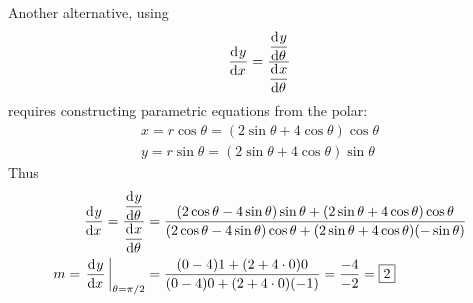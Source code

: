 \documentclass[12pt,answers]{exam}
\begin{document}
\begin{questions}
\begin{solution}
    Another alternative, using
    \[
        \dod{y}{x} = \frac{\dod{y}{\theta}}{\dod{x}{\theta}}
    \]
    requires constructing parametric equations from the polar:
    \begin{align*}
        x = r \cos \theta = (2\sin \theta + 4\cos \theta) \cos\theta \\ 
        y = r \sin \theta = (2\sin \theta + 4\cos \theta) \sin\theta
    \end{align*}
    Thus
    \begin{align*}
        \dod{y}{x} = \frac{\dod{y}{\theta}}{\dod{x}{\theta}}
        &= \frac{(2\cos\theta-4\sin\theta)\sin\theta + (2\sin\theta+4\cos\theta)\cos\theta}{(2\cos\theta - 4\sin\theta) \cos\theta + (2\sin\theta+4\cos\theta)(-\sin\theta)} \\ 
        m = \eval{\dod{y}{x}}_{\theta=\pi/2} 
        &= \frac{(0-4)1+(2+4\cdot0)0}{(0-4)0+(2+4\cdot0)(-1)} 
        = \frac{-4}{-2} = \boxed{2}
    \end{align*}

\end{solution}

\end{questions}
\end{document}
